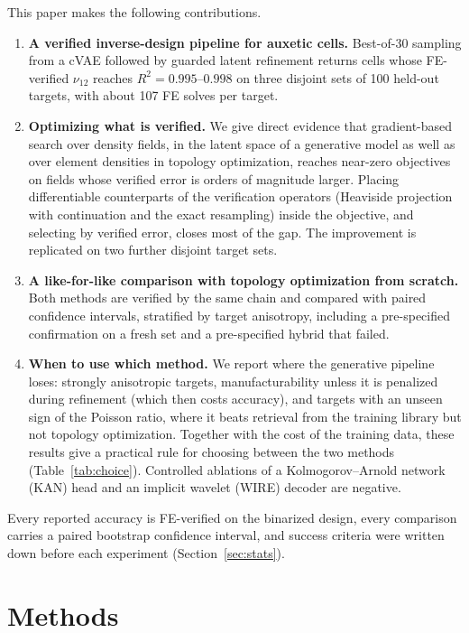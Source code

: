 \documentclass[a4paper,11pt]{article}
\newcommand{\nuot}{\nu_{12}}
\newcommand{\RR}{R^2}
\begin{document}
This paper makes the following contributions.
\begin{enumerate}
\item \textbf{A verified inverse-design pipeline for auxetic cells.}
Best-of-30 sampling from a cVAE followed by guarded latent refinement returns
cells whose FE-verified $\nuot$ reaches $\RR=0.995$--$0.998$ on three
disjoint sets of 100 held-out targets, with about 107 FE solves per target.
\item \textbf{Optimizing what is verified.} We give direct evidence that
gradient-based search over density fields, in the latent space of a
generative model as well as over element densities in topology
optimization, reaches near-zero objectives on fields whose verified error is
orders of magnitude larger. Placing differentiable counterparts of the
verification operators (Heaviside projection with continuation
\citep{guest2004achieving,wang2011projection} and the exact resampling)
inside the objective, and selecting by verified error, closes most of the
gap. The improvement is replicated on two further disjoint target sets.
\item \textbf{A like-for-like comparison with topology optimization from
scratch.} Both methods are verified by the same chain and compared with
paired confidence intervals, stratified by target anisotropy, including a
pre-specified confirmation on a fresh set and a pre-specified hybrid that
failed.
\item \textbf{When to use which method.} We report where the generative
pipeline loses: strongly anisotropic targets, manufacturability unless it is
penalized during refinement (which then costs accuracy), and targets
with an unseen sign of the Poisson ratio, where it beats retrieval from the
training library but not topology optimization. Together with the cost of
the training data, these results give a practical rule for choosing between
the two methods (Table~\ref{tab:choice}). Controlled ablations of a
Kolmogorov--Arnold network (KAN) head and an implicit wavelet (WIRE) decoder
are negative.
\end{enumerate}

Every reported accuracy is FE-verified on the binarized design, every
comparison carries a paired bootstrap confidence interval, and success
criteria were written down before each experiment (Section~\ref{sec:stats}).

\section{Methods}
\end{document}
